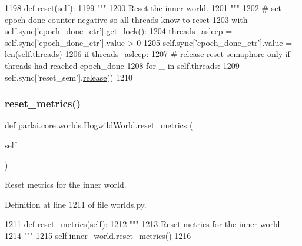 \begin{DoxyCode}
1198     \textcolor{keyword}{def }reset(self):
1199         \textcolor{stringliteral}{"""}
1200 \textcolor{stringliteral}{        Reset the inner world.}
1201 \textcolor{stringliteral}{        """}
1202         \textcolor{comment}{# set epoch done counter negative so all threads know to reset}
1203         with self.sync[\textcolor{stringliteral}{'epoch\_done\_ctr'}].get\_lock():
1204             threads\_asleep = self.sync[\textcolor{stringliteral}{'epoch\_done\_ctr'}].value > 0
1205             self.sync[\textcolor{stringliteral}{'epoch\_done\_ctr'}].value = -len(self.threads)
1206         \textcolor{keywordflow}{if} threads\_asleep:
1207             \textcolor{comment}{# release reset semaphore only if threads had reached epoch\_done}
1208             \textcolor{keywordflow}{for} \_ \textcolor{keywordflow}{in} self.threads:
1209                 self.sync[\textcolor{stringliteral}{'reset\_sem'}].\hyperlink{namespaceconf_a325dc746d8bf05c54d26351c35a21d90}{release}()
1210 
\end{DoxyCode}
\mbox{\label{classparlai_1_1core_1_1worlds_1_1HogwildWorld_ae57e2b90771c0feaa0496cb2885eae6d}} 
\subsubsection{\texorpdfstring{reset\+\_\+metrics()}{reset\_metrics()}}
{\footnotesize\ttfamily def parlai.\+core.\+worlds.\+Hogwild\+World.\+reset\+\_\+metrics (\begin{DoxyParamCaption}\item[{}]{self }\end{DoxyParamCaption})}

\begin{DoxyVerb}Reset metrics for the inner world.
\end{DoxyVerb}
 

Definition at line 1211 of file worlds.\+py.


\begin{DoxyCode}
1211     \textcolor{keyword}{def }reset\_metrics(self):
1212         \textcolor{stringliteral}{"""}
1213 \textcolor{stringliteral}{        Reset metrics for the inner world.}
1214 \textcolor{stringliteral}{        """}
1215         self.inner\_world.reset\_metrics()
1216 
\end{DoxyCode}
\mbox{\label{classparlai_1_1core_1_1worlds_1_1HogwildWorld_a1f7e4c566078aebdb5e837c6fed62b17}} 
